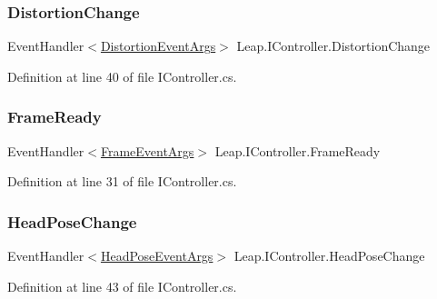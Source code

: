 \mbox{\label{interface_leap_1_1_i_controller_ae24e6374255a48c587c932f9b083c612}} 
\subsubsection{\texorpdfstring{DistortionChange}{DistortionChange}}
{\footnotesize\ttfamily Event\+Handler$<$\mbox{\hyperlink{class_leap_1_1_distortion_event_args}{Distortion\+Event\+Args}}$>$ Leap.\+I\+Controller.\+Distortion\+Change}



Definition at line 40 of file I\+Controller.\+cs.

\mbox{\label{interface_leap_1_1_i_controller_ab0ab6d34b37133ecd8d4a4dfb67d2de0}} 
\subsubsection{\texorpdfstring{FrameReady}{FrameReady}}
{\footnotesize\ttfamily Event\+Handler$<$\mbox{\hyperlink{class_leap_1_1_frame_event_args}{Frame\+Event\+Args}}$>$ Leap.\+I\+Controller.\+Frame\+Ready}



Definition at line 31 of file I\+Controller.\+cs.

\mbox{\label{interface_leap_1_1_i_controller_a64b663235fc1947beee7da9010c05e34}} 
\subsubsection{\texorpdfstring{HeadPoseChange}{HeadPoseChange}}
{\footnotesize\ttfamily Event\+Handler$<$\mbox{\hyperlink{class_leap_1_1_head_pose_event_args}{Head\+Pose\+Event\+Args}}$>$ Leap.\+I\+Controller.\+Head\+Pose\+Change}



Definition at line 43 of file I\+Controller.\+cs.


